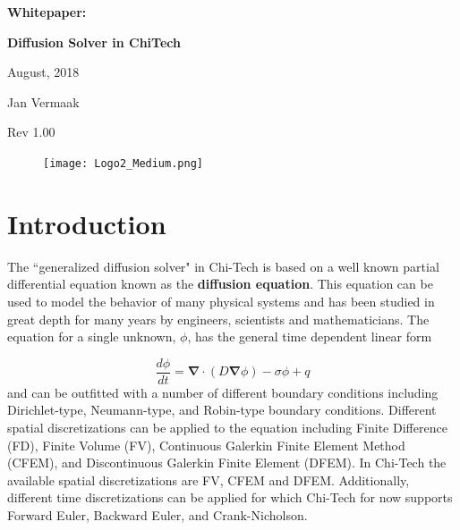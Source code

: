 \documentclass[11pt,letterpaper,titlepage]{article}
\newcommand{\DOCSUBJT}{Whitepaper: }   %
\newcommand{\DOCTITLE}{                      %
	Diffusion Solver in ChiTech
}
\newcommand{\DOCDATE} {August, 2018}         %
\newcommand{\DOCREV}  {Rev 1.00}             %
\newcommand{\bnabla}{\boldsymbol{\nabla}}
\numberwithin{equation}{section}
\begin{document}
\begin{titlepage}
	\pagestyle{fancy}
	\vspace*{1.0cm}
	\centering
	\vspace{1cm}
	\vspace{.25cm}
	{\Large\bfseries  \DOCSUBJT \par} 
	{\Large\bfseries \DOCTITLE  \par}
	\vspace{1cm}
	{\Large \DOCDATE \par}
	\vspace{1.0cm}
	{\Large Jan Vermaak \par}
	{\Large \DOCREV \par}
	\begin{center}
		\begin{minipage}[c]{0.45\textwidth}
			\begin{figure}[H]
				
				\texttt{[image: Logo2\_Medium.png]}
			\end{figure}
		\end{minipage}
	\end{center}

\end{titlepage}	


\pagestyle{fancy}
\cfoot{}
\lfoot{\truncate{14cm}{\DOCTITLE}}
\rhead{}
\chead{\currentname}
\lhead{}
\renewcommand{\footrulewidth}{0.4pt}


\tableofcontents
{}
%


\newpage
\section{Introduction}
The ``generalized diffusion solver" in Chi-Tech is based on a well known partial differential equation known as the \textbf{diffusion equation}. This equation can be used to model the behavior of many physical systems and has been studied in great depth for many years by engineers, scientists and mathematicians. The equation for a single unknown, $\phi$, has the general time dependent linear form

\begin{equation} \label{eq:general_diffeq}
\frac{d\phi}{dt} = \bnabla \cdot (D\bnabla\phi) - \sigma \phi + q
\end{equation}
\newline
and can be outfitted with a number of different boundary conditions including Dirichlet-type, Neumann-type, and Robin-type boundary conditions.
Different spatial discretizations can be applied to the equation including Finite Difference (FD), Finite Volume (FV), Continuous Galerkin Finite Element Method (CFEM), and Discontinuous Galerkin Finite Element (DFEM). In Chi-Tech the available spatial discretizations are FV, CFEM and DFEM. Additionally, different time discretizations can be applied for which Chi-Tech for now supports Forward Euler, Backward Euler, and Crank-Nicholson.
\end{document}
